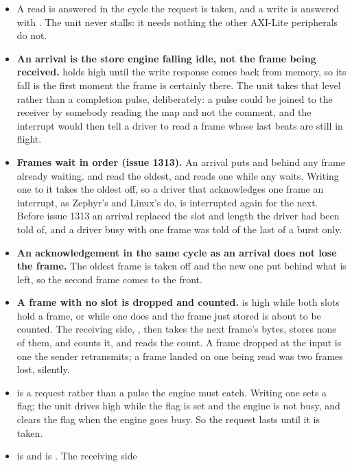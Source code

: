 \begin{itemize}
\item A read is answered in the cycle the request is taken, and a
write is answered with . The unit never stalls: it needs
nothing the other AXI-Lite peripherals do not.
\item \textbf{An arrival is the store engine falling idle, not the
frame being received.}  holds  high
until the write response comes back from memory, so its fall is the
first moment the frame is certainly there. The unit takes that level
rather than a completion pulse, deliberately: a pulse could be joined
to the receiver by somebody reading the map and not the comment, and
the interrupt would then tell a driver to read a frame whose last
beats are still in flight.
\item \textbf{Frames wait in order (issue 1313).} An arrival puts
 and  behind any frame already waiting.
 and  read the oldest, and
 reads one while any waits. Writing one to it
takes the oldest off, so a driver that acknowledges one frame an
interrupt, as Zephyr's and Linux's do, is interrupted again for the
next. Before issue 1313 an arrival replaced the slot and length the
driver had been told of, and a driver busy with one frame was told of
the last of a burst only.
\item \textbf{An acknowledgement in the same cycle as an arrival does
not lose the frame.} The oldest frame is taken off and the new one put
behind what is left, so the second frame comes to the front.
\item \textbf{A frame with no slot is dropped and counted.}
 is high while both slots hold a frame, or while one
does and the frame just stored is about to be counted. The receiving
side, , then takes the next frame's bytes, stores none
of them, and counts it, and  reads the count. A
frame dropped at the input is one the sender retransmits; a frame
landed on one being read was two frames lost, silently.
\item {} is a request rather than a pulse the engine
must catch. Writing one sets a flag; the unit drives 
high while the flag is set and the engine is not busy, and clears the
flag when the engine goes busy. So the request lasts until it is
taken.
\item {} is  and
 is . The receiving side

\end{itemize}
